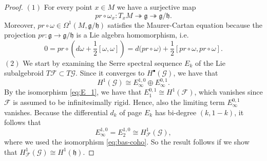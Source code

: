 \documentclass[10pt,a4paper]{amsart}
\begin{document}
	\begin{proof}
		$(1)$ For every point $x\in M$ we have a surjective map
		\[
		pr\circ\omega_x:T_{x}M\twoheadrightarrow\mathfrak{g}\twoheadrightarrow\mathfrak{g}/\mathfrak{h}.
		\]
		Moreover, $pr\circ\omega\in\Omega^{1}(M,\mathfrak{g}/\mathfrak{h})$ satisfies the Maurer-Cartan equation because the projection $pr:\mathfrak{g}\rightarrow \mathfrak{g}/\mathfrak{h}$ is a Lie algebra homomorphism, i.e.
		\[
		0=pr\circ\left(d\omega+\frac{1}{2}[\omega,\omega]\right)=d\big(pr\circ\omega\big)+\frac{1}{2}[pr\circ\omega,pr\circ\omega].
		\]
		$(2)$ We start by examining the Serre spectral sequence $E_k$ of the Lie subalgebroid $T\mathcal{F}\subset T\mathcal{G}$. Since it converges to $H^{\bullet}(\mathcal{G})$, we have that
		\[
		H^{1}(\mathcal{G})\cong E_{\infty}^{1,0}\oplus E_{\infty}^{0,1}.
		\]
		By the isomorphism \eqref{eq:E_1}, we have that $E_1^{0,1}\cong H^{1}(\mathcal{F})$, which vanishes since $\mathcal{F}$ is assumed to be infinitesimally rigid. Hence, also the limiting term $E_{\infty}^{0,1}$ vanishes. Because the differential $d_k$ of page $E_k$ has bi-degree $(k,1-k)$, it follows that
		\[
		E_{\infty}^{1,0}=E_2^{1,0}\cong H^{1}_{\mathcal{F}}(\mathcal{G}),
		\]
		where we used the isomorphism \eqref{eq:bas-coho}. So the result follows if we show that $H^{1}_{\mathcal{F}}(\mathcal{G})\cong H^{1}(\mathfrak{h})$.
		

\end{proof}
\end{document}
